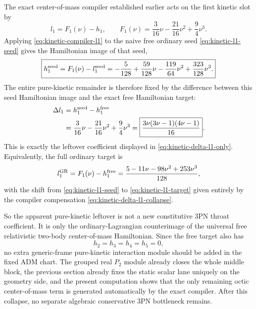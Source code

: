 \documentclass[11pt]{article}
\begin{document}
The exact center-of-mass compiler established earlier acts on the first kinetic
slot by
\begin{equation}
\boxed{
 l_1=F_1(\nu)-h_1,
 \qquad
 F_1(\nu)=\frac{3}{16}\nu-\frac{21}{16}\nu^2+\frac94\nu^3.
}
\label{eq:kinetic-compiler-l1}
\end{equation}
Applying \eqref{eq:kinetic-compiler-l1} to the naive free ordinary seed
\eqref{eq:kinetic-l1-seed} gives the Hamiltonian image of that seed,
\begin{equation}
\boxed{
 h_1^{\rm seed}
 =
 F_1(\nu)-l_1^{\rm seed}
 =
 -\frac{5}{128}+\frac{59}{128}\nu-\frac{119}{64}\nu^2+\frac{323}{128}\nu^3.
}
\label{eq:kinetic-h1-seed}
\end{equation}
The entire pure-kinetic remainder is therefore fixed by the difference between
this seed Hamiltonian image and the exact free Hamiltonian target:
\begin{equation}
\begin{aligned}
\Delta l_1
&=
 h_1^{\rm seed}-h_1^{\rm free}
\\
&=
\frac{3}{16}\nu-\frac{21}{16}\nu^2+\frac94\nu^3
=
\boxed{\frac{3\nu(3\nu-1)(4\nu-1)}{16}}.
\end{aligned}
\label{eq:kinetic-delta-l1-collapse}
\end{equation}
This is exactly the leftover coefficient displayed in
\eqref{eq:kinetic-delta-l1-only}.  Equivalently, the full ordinary target is
\begin{equation}
 l_1^{\rm GR}
 =
 F_1(\nu)-h_1^{\rm free}
 =
 \frac{5-11\nu-98\nu^2+253\nu^3}{128},
\label{eq:kinetic-l1-target}
\end{equation}
with the shift from \eqref{eq:kinetic-l1-seed} to
\eqref{eq:kinetic-l1-target} given entirely by the compiler compensation
\eqref{eq:kinetic-delta-l1-collapse}.

So the apparent pure-kinetic leftover is not a new constitutive $3$PN throat
coefficient.  It is only the ordinary-Lagrangian counterimage of the universal
free relativistic two-body center-of-mass Hamiltonian.  Since the free target
also has
\begin{equation}
 h_2=h_3=h_4=h_5=0,
\label{eq:kinetic-higher-free-zero}
\end{equation}
no extra generic-frame pure-kinetic interaction module should be added in the
fixed ADM chart.  The grouped real $P_2$ module already closes the whole middle
block, the previous section already fixes the static scalar lane uniquely on the
geometry side, and the present computation shows that the only remaining octic
center-of-mass term is generated automatically by the exact compiler.  After
this collapse, no separate algebraic conservative $3$PN bottleneck remains.
\end{document}
